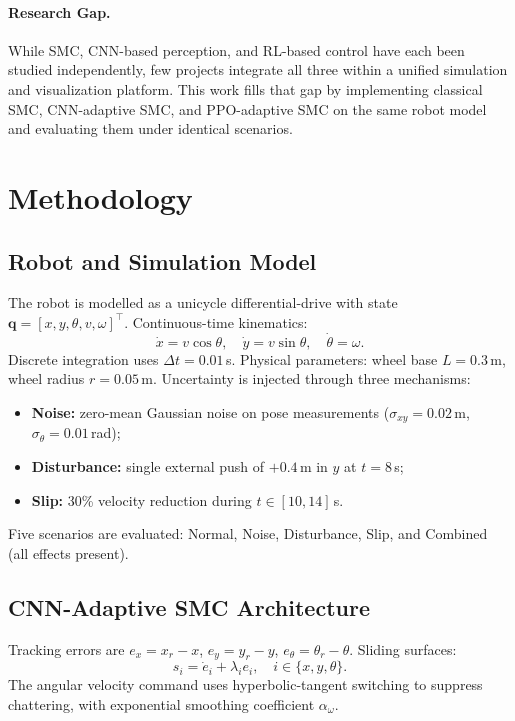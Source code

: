 \documentclass[11pt,a4paper]{article}
\begin{document}
\paragraph{Research Gap.}
While SMC, CNN-based perception, and RL-based control have each been studied independently, few projects integrate all three within a unified simulation and visualization platform. This work fills that gap by implementing classical SMC, CNN-adaptive SMC, and PPO-adaptive SMC on the same robot model and evaluating them under identical scenarios.

\section{Methodology}

\subsection{Robot and Simulation Model}

The robot is modelled as a unicycle differential-drive with state $\mathbf{q} = [x, y, \theta, v, \omega]^\top$. Continuous-time kinematics:
\begin{equation}
  \dot{x} = v\cos\theta, \quad \dot{y} = v\sin\theta, \quad \dot{\theta} = \omega.
  \label{eq:kinematics}
\end{equation}
Discrete integration uses $\Delta t = 0.01$\,s. Physical parameters: wheel base $L = 0.3$\,m, wheel radius $r = 0.05$\,m. Uncertainty is injected through three mechanisms:
\begin{itemize}
  \item \textbf{Noise:} zero-mean Gaussian noise on pose measurements ($\sigma_{xy}=0.02$\,m, $\sigma_\theta=0.01$\,rad);
  \item \textbf{Disturbance:} single external push of $+0.4$\,m in $y$ at $t=8$\,s;
  \item \textbf{Slip:} 30\% velocity reduction during $t \in [10, 14]$\,s.
\end{itemize}
Five scenarios are evaluated: Normal, Noise, Disturbance, Slip, and Combined (all effects present).

\subsection{CNN-Adaptive SMC Architecture}

Tracking errors are $e_x = x_r - x$, $e_y = y_r - y$, $e_\theta = \theta_r - \theta$. Sliding surfaces:
\begin{equation}
  s_i = \dot{e}_i + \lambda_i e_i, \quad i \in \{x, y, \theta\}.
\end{equation}
The angular velocity command uses hyperbolic-tangent switching to suppress chattering, with exponential smoothing coefficient $\alpha_\omega$.
\end{document}
